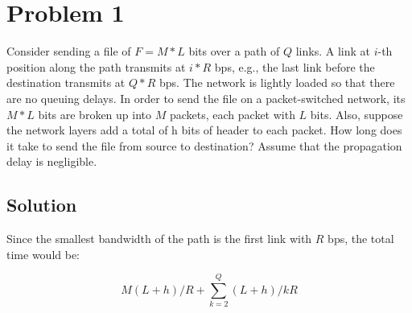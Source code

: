 
\section*{Problem 1}

Consider sending a file of $F = M * L$ bits over a path of $Q$ links.
A link at $i$-th position along the path transmits at $i * R$ bps, e.g., the last link before the destination transmits at $Q * R$ bps.
The network is lightly loaded so that there are no queuing delays.
In order to send the file on a packet-switched network, its $M * L$ bits are broken up into $M$ packets, each packet with $L$ bits.
Also, suppose the network layers add a total of h bits of header to each packet.
How long does it take to send the file from source to destination?
Assume that the propagation delay is negligible.

\subsection*{Solution}

Since the smallest bandwidth of the path is the first link with $R$ bps, the total time would be:

$$ M(L+h)/R + \sum_{k=2}^Q (L+h)/kR $$